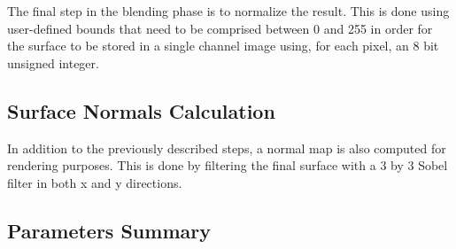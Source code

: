 	The final step in the blending phase is to normalize the result. This is done using user-defined bounds that need to be comprised between 0 and 255 in order for the surface to be stored in a single channel image using, for each pixel, an 8 bit unsigned integer.
    
  \subsection{Surface Normals Calculation}
  
    In addition to the previously described steps, a normal map is also computed for rendering purposes. This is done by filtering the final surface with a 3 by 3 Sobel filter in both x and y directions.
    
\begin{landscape}
  \pagestyle{lscape}
  
  \section {Parameters Summary}
  \vspace*{\fill}
  
  \begin{table}[h!] \centering \footnotesize
  	 \renewcommand{\arraystretch}{2.0}
  	

\end{table}
\end{landscape}
